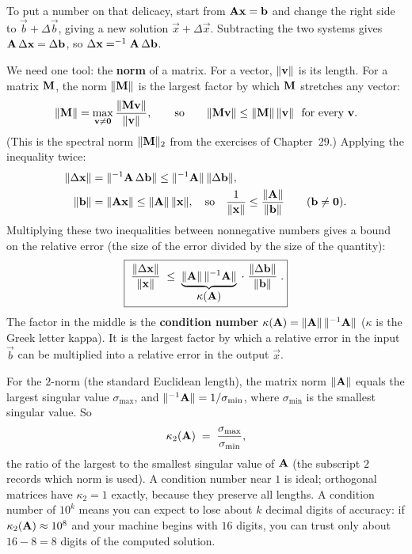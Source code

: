 To put a number on that delicacy, start from $\mathbf{A}\mathbf{x}=\mathbf{b}$ and change
the right side to $\vec{b}+\Delta\vec{b}$, giving a new solution
$\vec{x}+\Delta\vec{x}$. Subtracting the two systems gives $\mathbf{A}\,\Delta\mathbf{x} =
\Delta\mathbf{b}$, so $\Delta\mathbf{x} = ^{-1}{\mathbf{A}}\,\Delta\mathbf{b}$.

We need one tool: the \textbf{norm} of a matrix. For a vector, $\lVert\mathbf{v}\rVert$ is its
length. For a matrix $\mathbf{M}$, the norm $\lVert\mathbf{M}\rVert$ is the largest factor by which
$\mathbf{M}$ stretches any vector:
\[
  \lVert\mathbf{M}\rVert = \max_{\mathbf{v}\ne\mathbf{0}} \frac{\lVert\mathbf{M}\mathbf{v}\rVert}{\lVert\mathbf{v}\rVert},
  \qquad\text{so}\qquad
  \lVert\mathbf{M}\mathbf{v}\rVert\le\lVert\mathbf{M}\rVert\,\lVert\mathbf{v}\rVert \ \text{ for every } \mathbf{v}.
\]
(This is the spectral norm $\lVert\mathbf{M}\rVert_2$ from the exercises of Chapter~29.)
Applying the inequality twice:
\begin{align*}
  \lVert\Delta\mathbf{x}\rVert &= \lVert^{-1}{\mathbf{A}}\,\Delta\mathbf{b}\rVert
     \le \lVert^{-1}{\mathbf{A}}\rVert\,\lVert\Delta\mathbf{b}\rVert,\\
  \lVert\mathbf{b}\rVert &= \lVert\mathbf{A}\mathbf{x}\rVert \le \lVert\mathbf{A}\rVert\,\lVert\mathbf{x}\rVert,
  \quad\text{so}\quad
  \frac{1}{\lVert\mathbf{x}\rVert} \le \frac{\lVert\mathbf{A}\rVert}{\lVert\mathbf{b}\rVert}
  \qquad(\mathbf{b}\ne\mathbf{0}).
\end{align*}
Multiplying these two inequalities between nonnegative numbers gives a bound on the
relative error (the size of the error divided by the size of the quantity):
\[
  \boxed{\;\frac{\lVert\Delta\mathbf{x}\rVert}{\lVert\mathbf{x}\rVert}
   \;\le\; \underbrace{\lVert\mathbf{A}\rVert\,\lVert^{-1}{\mathbf{A}}\rVert}_{\displaystyle \kappa(\mathbf{A})}
   \;\cdot\; \frac{\lVert\Delta\mathbf{b}\rVert}{\lVert\mathbf{b}\rVert}\;.}
\]
The factor in the middle is the \textbf{condition number}
$\kappa(\mathbf{A}) = \lVert\mathbf{A}\rVert\,\lVert^{-1}{\mathbf{A}}\rVert$ ($\kappa$ is the Greek letter
kappa). It is the largest factor by which a relative error in the input $\vec{b}$ can be
multiplied into a relative error in the output $\vec{x}$.

\begin{formalbox}
For the $2$-norm (the standard Euclidean length), the matrix norm $\lVert\mathbf{A}\rVert$ equals
the largest singular value $\sigma_{\max}$, and $\lVert^{-1}{\mathbf{A}}\rVert = 1/\sigma_{\min}$,
where $\sigma_{\min}$ is the smallest singular value. So
\[
  \kappa_2(\mathbf{A}) \;=\; \frac{\sigma_{\max}}{\sigma_{\min}},
\]
the ratio of the largest to the smallest singular value of $\mathbf{A}$ (the subscript $2$
records which norm is used). A condition number near $1$ is ideal; orthogonal matrices
have $\kappa_2 = 1$ exactly, because they preserve all lengths. A condition number of
$10^{k}$ means you can expect to lose about $k$ decimal digits of accuracy: if
$\kappa_2(\mathbf{A})\approx 10^{8}$ and your machine begins with $16$ digits, you can trust
only about $16 - 8 = 8$ digits of the computed solution.
\end{formalbox}

